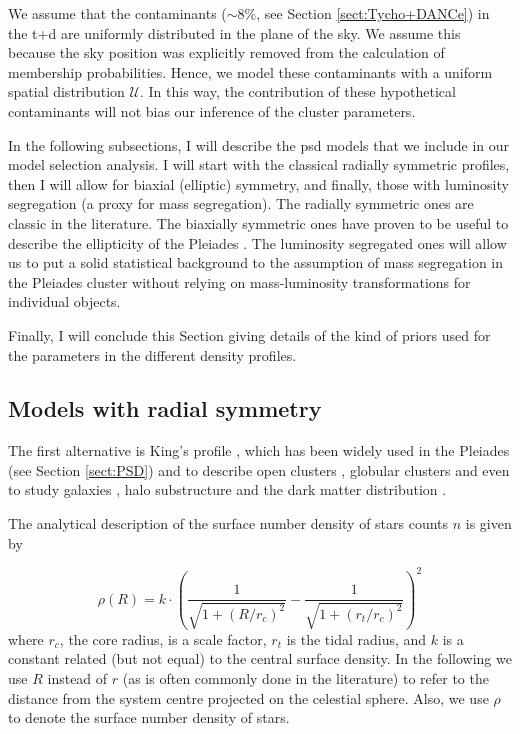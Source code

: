 We assume that the contaminants ($\sim 8\%$, see Section \ref{sect:Tycho+DANCe}) in the \gls{t+d} are uniformly distributed in the plane of the sky. We assume this because the sky position was explicitly removed from the calculation of membership probabilities. Hence, we model these contaminants with a uniform spatial distribution $\mathcal{U}$. In this way, the contribution of these hypothetical contaminants will not bias our inference of the cluster parameters.

In the following subsections, I will describe the \gls{psd} models that we include in our model selection analysis. I will start with the classical radially symmetric profiles, then I will allow for biaxial (elliptic) symmetry, and finally, those with luminosity segregation (a proxy for mass segregation). The radially symmetric ones are classic in the literature. The biaxially symmetric ones have proven to be useful to describe the ellipticity of the Pleiades \citep{Raboud1998}. The luminosity segregated ones will allow us to put a solid statistical background to the assumption of mass segregation in the Pleiades cluster \cite[see for example][]{2004A&A...426...75M, Converse2010} without relying on mass-luminosity transformations for individual objects. 

Finally, I will conclude this Section giving details of the kind of priors used for the parameters in the different density profiles.

\subsection{Models with radial symmetry}
\label{sec:modelselrad}
The first alternative is King's profile \citep{King1962}, which has been widely used in the Pleiades (see Section \ref{sect:PSD}) and to describe open clusters
\citep[see][for recent applications]{2017MNRAS.469.1330A,2017MNRAS.468.2684P}, globular clusters \citep{2017ApJ...840L..25M} and even to study
galaxies \citep{2017MNRAS.466.1513R}, halo substructure \citep{2007ApJ...663..960S} and the dark matter distribution \citep{2016MNRAS.458.2848J}. 

The analytical description of the surface number density of stars counts $n$ is given by

\begin{equation}
  \rho(R) =
  k\cdot\left(\frac{1}{\sqrt{1+(R/r_c)^2}}-\frac{1}{\sqrt{1+(r_t/r_c)^2}}\right)^2
\end{equation}
where $r_c$, the core radius, is a scale factor, $r_t$ is the tidal
radius, and $k$ is a constant related (but not equal) to the central
surface density. In the following we use $R$ instead of $r$ (as is
often commonly done in the literature) to refer to the distance from the
system centre projected on the celestial sphere. Also, we use $\rho$
to denote the surface number density of stars.

